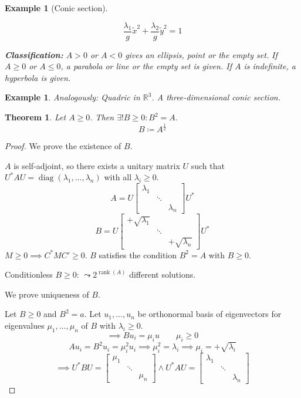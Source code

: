\documentclass{article}
\newcounter{lecref}[section]
\numberwithin{lecref}{section}
\newtheorem{theorem}[lecref]{Theorem}
\newtheorem{example}[lecref]{Example}
\DeclareMathOperator{\rank}{rank}
\begin{document}
\begin{example}[Conic section]
\begin{description}
\begin{description}
          \[ \frac{\lambda_1}{g} \tilde x^2 + \frac{\lambda_2}{g} \tilde y^2 = 1 \]

      \end{description}
  \end{description}

  \textbf{Classification:}
  $A > 0$ or $A < 0$ gives an ellipsis, point or the empty set.
  If $A \geq 0$ or $A \leq 0$, a parabola or line or the empty set is given.
  If $A$ is indefinite, a hyperbola is given.
\end{example}

\begin{example} %
  Analogously: Quadric in $\mathbb R^3$.
  A three-dimensional conic section.
\end{example}

\begin{theorem}
   Let $A \geq 0$. Then $\exists! B \geq 0: B^2 = A$.
   \[ B \coloneqq A^{\frac12} \]
\end{theorem}

\begin{proof}
  We prove the existence of $B$.

  $A$ is self-adjoint, so there exists a unitary matrix $U$ such that $U^* AU = \operatorname{diag}(\lambda_1, \dots, \lambda_n)$
  with all $\lambda_i \geq 0$.
  \[ A = U \begin{bmatrix} \lambda_1 & & \\ & \ddots & \\ & & \lambda_n \end{bmatrix} U^* \]
  \[ B = U \begin{bmatrix} +\sqrt{\lambda_1} & & \\ & \ddots & \\ & & +\sqrt{\lambda_n} \end{bmatrix} U^* \]
  $M \geq 0 \implies C^* MC' \geq 0$.
  $B$ satisfies the condition $B^2 = A$ with $B \geq 0$.

  Conditionless $B \geq 0$: $\leadsto 2^{\rank(A)}$ different solutions.

  We prove uniqueness of $B$.

  Let $B \geq 0$ and $B^2 = a$.
  Let $u_1, \dots, u_n$ be orthonormal basis of eigenvectors for eigenvalues $\mu_1, \dots, \mu_n$ of $B$ with $\lambda_i \geq 0$.
  \[ \implies Bu_i = \mu_i u \qquad \mu_i \geq 0 \]
  \[ Au_i = B^2 u_i = \mu_i^2 u_i \implies \mu_i^2 = \lambda_i \implies \mu_i = +\sqrt{\lambda_i} \]
  \[
    \implies U^* BU = \begin{bmatrix} \mu_1 & & \\ & \ddots & \\ & & \mu_n \end{bmatrix}
    \land    U^* AU = \begin{bmatrix} \lambda_1 & & \\ & \ddots & \\ & & \lambda_n \end{bmatrix}
  \]
\end{proof}
\end{document}

